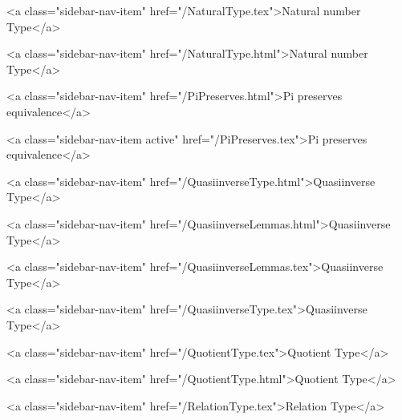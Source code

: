       
        
          <a class="sidebar-nav-item" href="/NaturalType.tex">Natural number Type</a>
        
      
    
      
        
          <a class="sidebar-nav-item" href="/NaturalType.html">Natural number Type</a>
        
      
    
      
        
          <a class="sidebar-nav-item" href="/PiPreserves.html">Pi preserves equivalence</a>
        
      
    
      
        
          <a class="sidebar-nav-item active" href="/PiPreserves.tex">Pi preserves equivalence</a>
        
      
    
      
        
          <a class="sidebar-nav-item" href="/QuasiinverseType.html">Quasiinverse Type</a>
        
      
    
      
        
          <a class="sidebar-nav-item" href="/QuasiinverseLemmas.html">Quasiinverse Type</a>
        
      
    
      
        
          <a class="sidebar-nav-item" href="/QuasiinverseLemmas.tex">Quasiinverse Type</a>
        
      
    
      
        
          <a class="sidebar-nav-item" href="/QuasiinverseType.tex">Quasiinverse Type</a>
        
      
    
      
        
          <a class="sidebar-nav-item" href="/QuotientType.tex">Quotient Type</a>
        
      
    
      
        
          <a class="sidebar-nav-item" href="/QuotientType.html">Quotient Type</a>
        
      
    
      
        
          <a class="sidebar-nav-item" href="/RelationType.tex">Relation Type</a>
        
